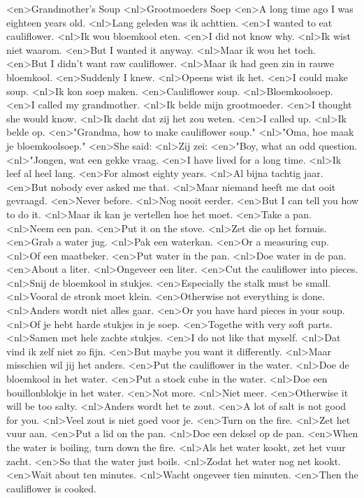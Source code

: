 <en>Grandmother's Soup
<nl>Grootmoeders Soep
<en>A long time ago I was eighteen years old.
<nl>Lang geleden was ik achttien.
<en>I wanted to eat cauliflower.
<nl>Ik wou bloemkool eten.
<en>I did not know why.
<nl>Ik wist niet waarom.
<en>But I wanted it anyway.
<nl>Maar ik wou het toch.
<en>But I didn't want raw cauliflower.
<nl>Maar ik had geen zin in rauwe bloemkool.
<en>Suddenly I knew.
<nl>Opeens wist ik het.
<en>I could make soup.
<nl>Ik kon soep maken.
<en>Cauliflower soup.
<nl>Bloemkoolsoep.
<en>I called my grandmother.
<nl>Ik belde mijn grootmoeder.
<en>I thought she would know.
<nl>Ik dacht dat zij het zou weten.
<en>I called up.
<nl>Ik belde op.
<en>"Grandma, how to make cauliflower soup."
<nl>"Oma, hoe maak je bloemkoolsoep."
<en>She said:
<nl>Zij zei:
<en>"Boy, what an odd question.
<nl>"Jongen, wat een gekke vraag.
<en>I have lived for a long time.
<nl>Ik leef al heel lang.
<en>For almost eighty years.
<nl>Al bijna tachtig jaar.
<en>But nobody ever asked me that.
<nl>Maar niemand heeft me dat ooit gevraagd.
<en>Never before.
<nl>Nog nooit eerder.
<en>But I can tell you how to do it.
<nl>Maar ik kan je vertellen hoe het moet.
<en>Take a pan.
<nl>Neem een pan.
<en>Put it on the stove.
<nl>Zet die op het fornuis.
<en>Grab a water jug.
<nl>Pak een waterkan.
<en>Or a measuring cup.
<nl>Of een maatbeker.
<en>Put water in the pan.
<nl>Doe water in de pan.
<en>About a liter.
<nl>Ongeveer een liter.
<en>Cut the cauliflower into pieces.
<nl>Snij de bloemkool in stukjes.
<en>Especially the stalk must be small.
<nl>Vooral de stronk moet klein.
<en>Otherwise not everything is done.
<nl>Anders wordt niet alles gaar.
<en>Or you have hard pieces in your soup.
<nl>Of je hebt harde stukjes in je soep.
<en>Togethe with very soft parts.
<nl>Samen met hele zachte stukjes.
<en>I do not like that myself.
<nl>Dat vind ik zelf niet zo fijn.
<en>But maybe you want it differently.
<nl>Maar misschien wil jij het anders.
<en>Put the cauliflower in the water.
<nl>Doe de bloemkool in het water.
<en>Put a stock cube in the water.
<nl>Doe een bouillonblokje in het water.
<en>Not more.
<nl>Niet meer.
<en>Otherwise it will be too salty.
<nl>Anders wordt het te zout.
<en>A lot of salt is not good for you.
<nl>Veel zout is niet goed voor je.
<en>Turn on the fire.
<nl>Zet het vuur aan.
<en>Put a lid on the pan.
<nl>Doe een deksel op de pan.
<en>When the water is boiling, turn down the fire.
<nl>Als het water kookt, zet het vuur zacht.
<en>So that the water just boils.
<nl>Zodat het water nog net kookt.
<en>Wait about ten minutes.
<nl>Wacht ongeveer tien minuten.
<en>Then the cauliflower is cooked.
